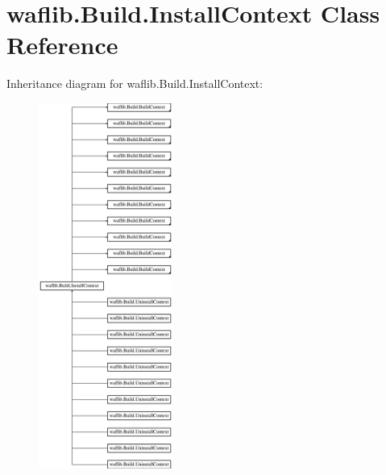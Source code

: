\hypertarget{classwaflib_1_1_build_1_1_install_context}{}\section{waflib.\+Build.\+Install\+Context Class Reference}
\label{classwaflib_1_1_build_1_1_install_context}
Inheritance diagram for waflib.\+Build.\+Install\+Context\+:\begin{figure}[H]
\begin{center}
\leavevmode
\includegraphics[height=12.000000cm]{classwaflib_1_1_build_1_1_install_context}
\end{center}
\end{figure}
